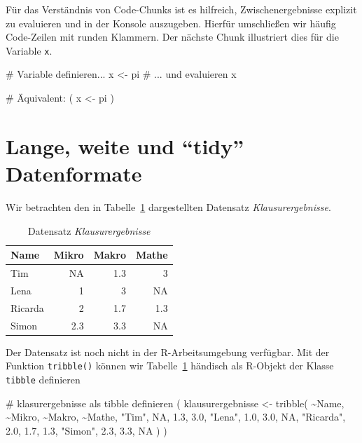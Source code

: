 \documentclass[
  a4paper,
  DIV=11,
  oneside]{scrreprt}
\newenvironment{Shaded}{\begin{snugshade}}{\end{snugshade}}
\newcommand{\NormalTok}[1]{\textcolor[rgb]{0.00,0.23,0.31}{#1}}
\begin{document}
Für das Verständnis von Code-Chunks ist es hilfreich, Zwischenergebnisse
explizit zu evaluieren und in der Konsole auszugeben. Hierfür
umschließen wir häufig Code-Zeilen mit runden Klammern. Der nächste
Chunk illustriert dies für die Variable \texttt{x}.

\begin{Shaded}
\begin{Highlighting}[]
\NormalTok{\# Variable definieren...}
\NormalTok{x \textless{}{-} pi}
\NormalTok{\# ... und evaluieren}
\NormalTok{x}

\NormalTok{\# Äquivalent:}
\NormalTok{(}
\NormalTok{  x \textless{}{-} pi}
\NormalTok{)}
\end{Highlighting}
\end{Shaded}

\section{Lange, weite und ``tidy''
Datenformate}\label{lange-weite-und-tidy-datenformate}

Wir betrachten den in Tabelle~\ref{tbl-Klausurergebnisse} dargestellten
Datensatz \emph{Klausurergebnisse}.

\begingroup
\fontsize{12.0pt}{14.4pt}\selectfont

\begin{longtable}{lrrr}

\caption{\label{tbl-Klausurergebnisse}Datensatz
\emph{Klausurergebnisse}}

\tabularnewline

\toprule
Name & Mikro & Makro & Mathe \\ 
\midrule\addlinespace[2.5pt]
Tim & NA & 1.3 & 3 \\ 
Lena & 1 & 3 & NA \\ 
Ricarda & 2 & 1.7 & 1.3 \\ 
Simon & 2.3 & 3.3 & NA \\ 
\bottomrule

\end{longtable}

\endgroup

Der Datensatz ist noch nicht in der R-Arbeitsumgebung verfügbar. Mit der
Funktion \texttt{tribble()} können wir
Tabelle~\ref{tbl-Klausurergebnisse} händisch als R-Objekt der Klasse
\texttt{tibble} definieren

\begin{Shaded}
\begin{Highlighting}[]
\NormalTok{\# \textquotesingle{}klasurergebnisse\textquotesingle{} als tibble definieren}
\NormalTok{(}
\NormalTok{  klausurergebnisse \textless{}{-} tribble(}
\NormalTok{    \textasciitilde{}Name,    \textasciitilde{}Mikro, \textasciitilde{}Makro, \textasciitilde{}Mathe,}
\NormalTok{    "Tim",        NA,    1.3,    3.0,}
\NormalTok{    "Lena",      1.0,    3.0,     NA,}
\NormalTok{    "Ricarda",   2.0,    1.7,    1.3,}
\NormalTok{    "Simon",     2.3,    3.3,     NA}
\NormalTok{  )}
\NormalTok{)}
\end{Highlighting}
\end{Shaded}
\end{document}
